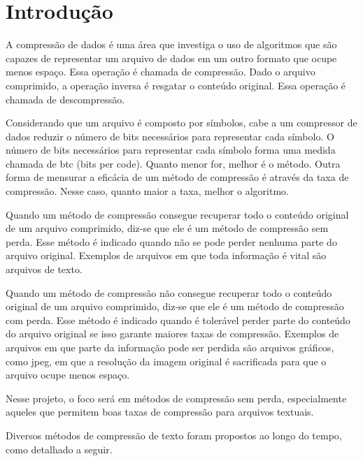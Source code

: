 \documentclass[a4paper,12pt,oneside]{article}
\begin{document}
\section{Introdução}


A compressão de dados é uma área que investiga o uso de algoritmos que são capazes de representar um arquivo de dados em um outro formato que ocupe menos espaço. Essa operação é chamada de compressão. Dado o arquivo comprimido, a operação inversa é resgatar o conteúdo original. Essa operação é chamada de descompressão. 

Considerando que um arquivo é composto por símbolos, cabe a um compressor de dados reduzir o número de bits necessários para representar cada símbolo. O número de bits necessários para representar cada símbolo forma uma medida chamada de btc (bits per code). Quanto menor for, melhor é o método. Outra forma de mensurar a eficácia de um método de compressão é através da taxa de compressão. Nesse caso, quanto maior a taxa, melhor o algoritmo. 

Quando um método de compressão consegue recuperar todo o conteúdo original de um arquivo comprimido, diz-se que ele é um método de compressão sem perda. Esse método é indicado quando não se pode perder nenhuma parte do arquivo original. Exemplos de arquivos em que toda informação é vital são arquivos de texto. 

Quando um método de compressão não consegue recuperar todo o conteúdo original de um arquivo comprimido, diz-se que ele é um método de compressão com perda. Esse método é indicado quando é tolerável perder parte do conteúdo do arquivo original se isso garante maiores taxas de compressão. Exemplos de arquivos em que parte da informação pode ser perdida são arquivos gráficos, como jpeg, em que a resolução da imagem original é sacrificada para que o arquivo ocupe menos espaço. 

Nesse projeto, o foco será em métodos de compressão sem perda, especialmente aqueles que permitem boas taxas de compressão para arquivos textuais. 

Diversos métodos de compressão de texto foram propostos ao longo do tempo, como detalhado a seguir.
\end{document}
